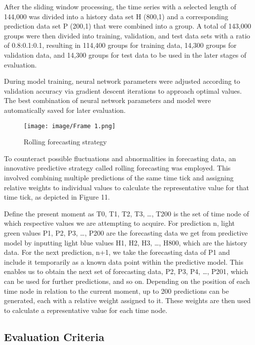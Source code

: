 \documentclass[sn-mathphys,Numbered]{sn-jnl}%
\theoremstyle{thmstyleone}%
\theoremstyle{thmstyletwo}%
\theoremstyle{thmstylethree}%
\begin{document}
After the sliding window processing, the time series with a selected length of 144,000 was divided into a history data set H (800,1) and a corresponding prediction data set P (200,1) that were combined into a group. A total of 143,000 groups were then divided into training, validation, and test data sets with a ratio of 0.8:0.1:0.1, resulting in 114,400 groups for training data, 14,300 groups for validation data, and 14,300 groups for test data to be used in the later stages of evaluation. 


During model training, neural network parameters were adjusted according to validation accuracy via gradient descent iterations to approach optimal values. The best combination of neural network parameters and model were automatically saved for later evaluation. 

\begin{figure}[htp]
    \centering
    \texttt{[image: image/Frame 1.png]}
    \caption{\centering  Rolling forecasting strategy}
    \label{fig:rolling}
\end{figure}

To counteract possible fluctuations and abnormalities in forecasting data, an innovative predictive strategy called rolling forecasting was employed. This involved combining multiple predictions of the same time tick and assigning relative weights to individual values to calculate the representative value for that time tick, as depicted in Figure 11.


Define the present moment as T0, {T1, T2, T3, …, T200} is the set of time node of which respective values we are attempting to acquire. For prediction n, light green values {P1, P2, P3, …, P200} are the forecasting data we get from predictive model by inputting light blue values {H1, H2, H3, …, H800}, which are the history data. For the next prediction, n+1, we take the forecasting data of P1 and include it temporarily as a known data point within the predictive model. This enables us to obtain the next set of forecasting data, {P2, P3, P4, …, P201}, which can be used for further predictions, and so on. Depending on the position of each time node in relation to the current moment, up to 200 predictions can be generated, each with a relative weight assigned to it. These weights are then used to calculate a representative value for each time node.

\subsection{Evaluation Criteria}\label{subsec8}
\end{document}
